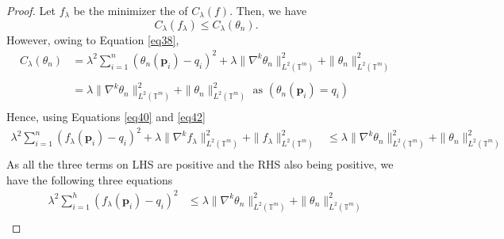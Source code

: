\documentclass[multixcb]{amstext-l}
\theoremstyle{plain}
\theoremstyle{definition}
\theoremstyle{definition}
\theoremstyle{remark}
\numberwithin{equation}{chapter}
\begin{document}
\begin{proof}
Let $f_{\lambda}$ be the minimizer the of $C_{\lambda}(f)$. Then, we have
\begin{equation}\label{eq40}
    C_{\lambda}(f_{\lambda}) \le C_{\lambda}(\theta_n).
\end{equation} 
However, owing to Equation \ref{eq38},
\begin{equation}\label{eq42}
\begin{aligned}
  C_{\lambda}(\theta_n)  &= \lambda^2\sum\limits_{i=1}^{n}(\theta_n(\boldsymbol{p}_i)-q_i)^2+  \lambda\|\nabla^k \theta_n\|_{L^2(\mathbb{T}^m)}^2 + \|\theta_n\|_{L^2(\mathbb{T}^m)}^2\\\\
    &=   \lambda\|\nabla^k \theta_n\|_{L^2(\mathbb{T}^m)}^2 + \|\theta_n\|_{L^2(\mathbb{T}^m)}^2 \mbox{    as                              }( \theta_n(\boldsymbol{p}_i) = q_i )\\
  \end{aligned}
\end{equation}
Hence, using Equations \ref{eq40} and \ref{eq42} 
\begin{equation}\label{deq}
\begin{aligned}
\lambda^2\sum\limits_{i=1}^{n}(f_{\lambda}(\boldsymbol{p}_i)-q_i)^2 + \lambda\|\nabla^kf_{\lambda}\|_{L^2(\mathbb{T}^m)}^2 + \|f_{\lambda}\|_{L^2(\mathbb{T}^m)}^2 &\le \lambda\|\nabla^k \theta_n\|_{L^2(\mathbb{T}^m)}^2 + \|\theta_n\|_{L^2(\mathbb{T}^m)}^2\\
\end{aligned}
\end{equation}As all the three terms on LHS are positive and the RHS also being positive, we have the following three equations
\begin{equation}\label{eq_sqr_err}\begin{aligned}
\lambda^2\sum\limits_{i=1}^{h}(f_{\lambda}(\boldsymbol{p}_i)-q_i)^2 &\le \lambda\|\nabla^k \theta_n\|_{L^2(\mathbb{T}^m)}^2 + \|\theta_n\|_{L^2(\mathbb{T}^m)}^2\\

\end{aligned}
\end{equation}
\end{proof}
\end{document}
